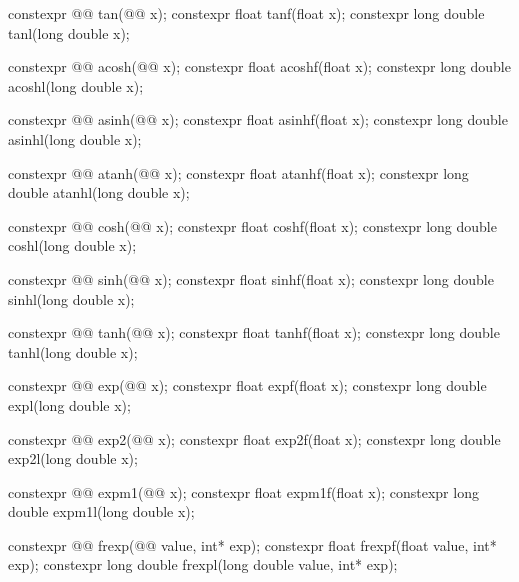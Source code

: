 \begin{codeblock}
{  constexpr @@ tan(@@ x);
  constexpr float               tanf(float x);
  constexpr long double         tanl(long double x);

  constexpr @@ acosh(@@ x);
  constexpr float               acoshf(float x);
  constexpr long double         acoshl(long double x);

  constexpr @@ asinh(@@ x);
  constexpr float               asinhf(float x);
  constexpr long double         asinhl(long double x);

  constexpr @@ atanh(@@ x);
  constexpr float               atanhf(float x);
  constexpr long double         atanhl(long double x);

  constexpr @@ cosh(@@ x);
  constexpr float               coshf(float x);
  constexpr long double         coshl(long double x);

  constexpr @@ sinh(@@ x);
  constexpr float               sinhf(float x);
  constexpr long double         sinhl(long double x);

  constexpr @@ tanh(@@ x);
  constexpr float               tanhf(float x);
  constexpr long double         tanhl(long double x);

  constexpr @@ exp(@@ x);
  constexpr float               expf(float x);
  constexpr long double         expl(long double x);

  constexpr @@ exp2(@@ x);
  constexpr float               exp2f(float x);
  constexpr long double         exp2l(long double x);

  constexpr @@ expm1(@@ x);
  constexpr float               expm1f(float x);
  constexpr long double         expm1l(long double x);

  constexpr @@ frexp(@@ value, int* exp);
  constexpr float               frexpf(float value, int* exp);
  constexpr long double         frexpl(long double value, int* exp);

}
\end{codeblock}

